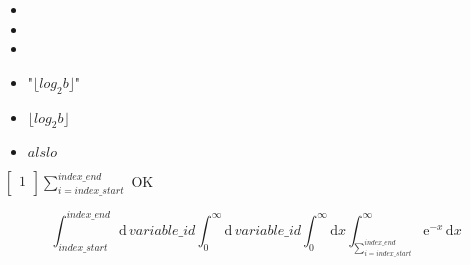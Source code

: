 \documentclass[12pt,addpoints]{article}
\begin{document}
\begin{itemize}
	\item 
	\item
	\item
\end{itemize}




\begin{itemize}
	\item "$\lfloor log_{2} b \rfloor$"
	\item $\lfloor log_{2} b \rfloor$
	\item $alslo$

\end{itemize}
$
\left[ {\begin{array}{c}
    1  \\
\end{array} } \right]
\sum\limits_{i = index\_start}^{index\_end}
$
OK


\[ \int_{index\_start}^{index\_end} \mathrm{d} \, variable\_id \int_{0}^{\infty} \mathrm{d} \, variable\_id \int_{0}^{\infty} \mathrm{d} x
 \int_{\sum\limits_{i = index\_start}^{index\_end}}^{\infty}\mathrm{e}^{-x}\, \mathrm{d} x
 \]

 
\end{document}
